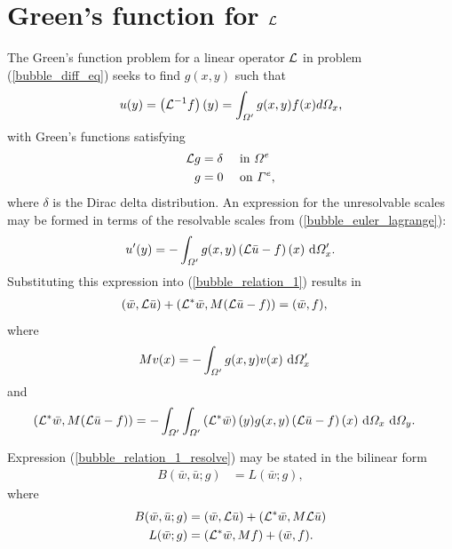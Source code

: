 
\section{Green's function for $\mathcal{L}$}

The Green's function problem for a linear operator $\mathcal{L}$ in problem (\ref{bubble_diff_eq}) seeks to find $g(x,y)$ such that
$$u(y) = \left(\mathcal{L}^{-1}f\right)(y) = \int_{\varOmega'} g(x,y)f(x)d\varOmega_x,$$
with Green's functions satisfying
\begin{align*}
  \mathcal{L} g &= \delta &&\text{ in } \varOmega^e \\
  g     &= 0 &&\text{ on } \varGamma^e,
\end{align*}
where $\delta$ is the Dirac delta distribution.  An expression for the unresolvable scales may be formed in terms of the resolvable scales from (\ref{bubble_euler_lagrange}):
\begin{align}
  \label{greens_ftn_prob}
  u'(y) = - \int_{\varOmega'} g(x,y) \left(\mathcal{L}\bar{u} - f\right)(x) \ \mathrm{d}\varOmega_x'.
\end{align}
Substituting this expression into (\ref{bubble_relation_1}) results in
\begin{align}
  \label{bubble_relation_1_resolve}
  (\bar{w}, \mathcal{L} \bar{u}) + (\mathcal{L}^* \bar{w}, M(\mathcal{L}\bar{u} - f)) &= (\bar{w}, f),
\end{align}
where
\begin{align}
  \label{subgrid_scale_integral}
  M v(x) &= - \int_{\varOmega'} g(x,y) v(x) \ \mathrm{d}\varOmega_x'
\end{align}
and
{\small
\begin{align*}
  (\mathcal{L}^* \bar{w}, M(\mathcal{L}\bar{u} - f)) &= - \int_{\varOmega'} \int_{\varOmega'} \left( \mathcal{L}^* \bar{w} \right)(y) g(x,y) \left( \mathcal{L} \bar{u} - f \right)(x) \ \mathrm{d}\varOmega_x \ \mathrm{d}\varOmega_y.
\end{align*}}

Expression (\ref{bubble_relation_1_resolve}) may be stated in the bilinear form
\begin{align*}
  B(\bar{w}, \bar{u}; g) &= L(\bar{w}; g),
\end{align*}
where
\begin{align*}
  B(\bar{w}, \bar{u}; g) &= (\bar{w}, \mathcal{L} \bar{u}) + (\mathcal{L}^* \bar{w}, M \mathcal{L}\bar{u}) \\
  L(\bar{w}; g) &= (\mathcal{L}^* \bar{w}, Mf) + (\bar{w}, f).
\end{align*}

